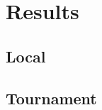 \section{Results}\label{results}

\subsection{Local}\label{results:local}

\subsection{Tournament}\label{results:tournament}
